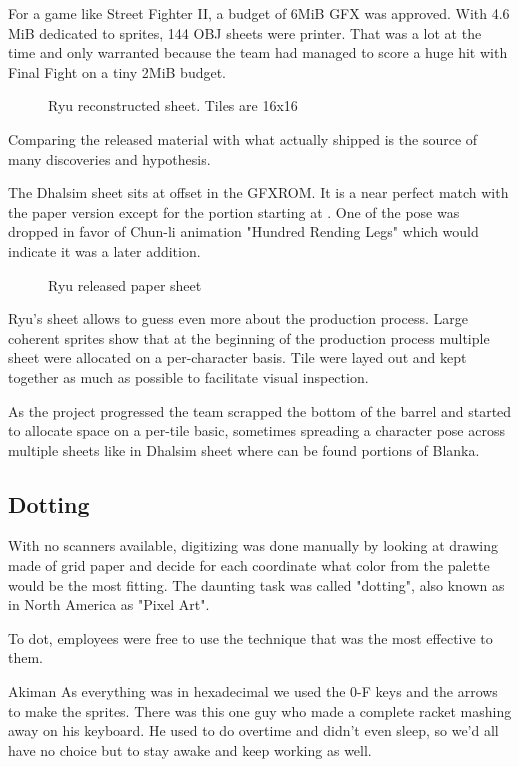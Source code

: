 For a game like Street Fighter II, a budget of 6MiB GFX was approved. With 4.6 MiB dedicated to sprites, 144 OBJ sheets were printer. That was a lot at the time and only warranted because the team had managed to score a huge hit with Final Fight on a tiny 2MiB budget. 




 \begin{figure}[H]
\caption*{Ryu reconstructed sheet. Tiles are 16x16}
\end{figure}


Comparing the released material with what actually shipped is the source of many discoveries and hypothesis. 

The Dhalsim sheet sits at offset  in the GFXROM. It is a near perfect match with the paper version except for the portion starting at . One of the pose was dropped in favor of Chun-li animation "Hundred Rending Legs" which would indicate it was a later addition. 

 \begin{figure}[H]
\caption*{Ryu released paper sheet}
\end{figure}

Ryu's sheet  allows to guess even more about the production process. Large coherent sprites show that at the beginning of the production process multiple sheet were allocated on a per-character basis. Tile were layed out and kept together as much as possible to facilitate visual inspection.

As the project progressed the team scrapped the bottom of the barrel and started to allocate space on a per-tile basic, sometimes spreading a character pose across multiple sheets like in Dhalsim sheet where can be found portions of Blanka.


\subsection{Dotting}


With no scanners available, digitizing was done manually by looking at drawing made of grid paper and decide for each coordinate what color from the palette would be the most fitting. The daunting task was called "dotting", also known as in North America as "Pixel Art". 

To dot, employees were free to use the technique that was the most effective to them.


\begin{q}{Akiman\cite{ar20160404}}
  As everything was in hexadecimal we used the 0-F keys and the arrows to make the sprites. There was this one guy who made a complete racket mashing away on his keyboard. He used to do overtime and didn't even sleep, so we'd all have no choice but to stay awake and keep working as well.
\end{q}

